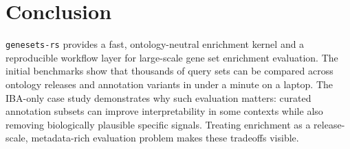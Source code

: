 \documentclass[11pt]{article}
\newcommand{\tool}{\texttt{genesets-rs}}
\begin{document}
\section{Conclusion}

\tool{} provides a fast, ontology-neutral enrichment kernel and a reproducible workflow layer for large-scale gene set enrichment evaluation. The initial benchmarks show that thousands of query sets can be compared across ontology releases and annotation variants in under a minute on a laptop. The IBA-only case study demonstrates why such evaluation matters: curated annotation subsets can improve interpretability in some contexts while also removing biologically plausible specific signals. Treating enrichment as a release-scale, metadata-rich evaluation problem makes these tradeoffs visible.



\end{document}
